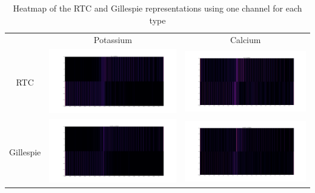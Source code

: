 \onecolumn
\begin{table}[]
    \centering
        \begin{tabular}{ccc}
        & Potassium & Calcium\\
        RTC &
        \includegraphics[width=.45\linewidth,valign=m]{Figures/1/K_RTC_.png} &
        \includegraphics[width=.45\linewidth,valign=m]{Figures/1/Ca_RTC_.png} \\
        Gillespie &
        \includegraphics[width=.45\linewidth,valign=m]{Figures/1/K_GILLESPIE_.png} &
        \includegraphics[width=.45\linewidth,valign=m]{Figures/1/Ca_GILLESPIE_.png} \\
        \end{tabular}
    \caption{Heatmap of the RTC and Gillespie representations using one channel for each type}
    \label{tab:my_label}
\end{table}

